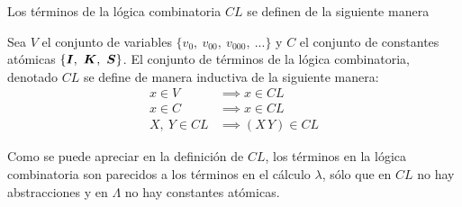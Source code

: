 Los términos de la lógica combinatoria \( CL \) se definen de la siguiente manera

\begin{defn}[Términos CL]\label{defn:terminos-cl}
  Sea \( V \) el conjunto de variables \( \{v_{0},\ v_{00},\ v_{000},\ ...\} \) y \( C \) el conjunto de constantes atómicas \( \{ \boldsymbol{I},\ \boldsymbol{K},\ \boldsymbol{S} \} \). El conjunto de términos de la lógica combinatoria, denotado \( CL \) se define de manera inductiva de la siguiente manera:
  \begin{subequations}
    \begin{align}
      \label{terminos-cl:atomos} \tag{a}
      x \in V & \implies x \in CL \\
      \label{terminos-cl:constantes} \tag{b}
      x \in C & \implies x \in CL  \\
      \label{terminos-cl:aplicaciones} \tag{c}
      X,\ Y \in CL & \implies (X\, Y) \in CL
    \end{align}
  \end{subequations}
\end{defn}

Como se puede apreciar en la definición de \( CL \), los términos en la lógica combinatoria son parecidos a los términos en el cálculo \( λ \), sólo que en \( CL \) no hay abstracciones y en \( Λ \) no hay constantes atómicas.

